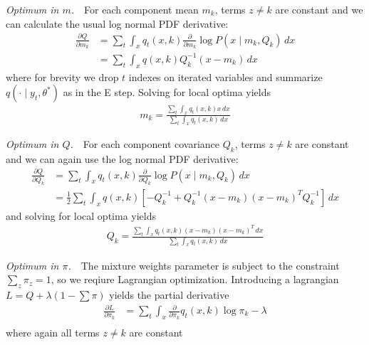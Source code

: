 \documentclass{article}         %
\newcommand{\inv}{^{-1}}
\newcommand{\pd}{\partial}
\newcommand{\EE}{\mathbb{E}}
\newcommand{\NN}{\mathcal{N}}
\newcommand{\pn}[1]{\left( #1 \right)}
\newcommand{\bc}[1]{\left[ #1 \right]}
\begin{document}
\textit{Optimum in $m$.}\ \ For each component mean $m_k$, terms $z\neq k$ are constant and we can calculate the usual log normal PDF derivative:
\begin{align}
    \frac{\pd Q}{\pd m_k}
    &=  \sum_{t}\int_{x} q_t(x, k) \frac{\pd}{\pd m_k} \log P(x \mid m_k, Q_k) \,dx \\
    &=  \sum_{t}\int_{x} q(x, k) Q_k\inv (x - m_k) \,dx
\end{align}
where for brevity we drop $t$ indexes on iterated variables and summarize $q(\cdot \mid y_t, \theta^*)$ as in the E step. Solving for local optima yields
\begin{align}
    m_k = \frac{\sum_{t} \int_x q_t(x, k) x \,dx}{\sum_{t} \int_x q_t(x, k) \,dx} 
\end{align}

\textit{Optimum in $Q$.}\ \ For each component covariance $Q_k$, terms $z\neq k$ are constant and we can again use the log normal PDF derivative: 
\begin{align}
    \frac{\pd Q}{\pd Q_k}
    &=  \sum_{t}\int_{x} q_t(x, k) \frac{\pd}{\pd Q_k} \log P(x \mid m_k, Q_k) \,dx \\
    &=  \frac{1}{2} \sum_{t}\int_{x} q(x, k) \bc{ -Q_k\inv + Q_k\inv (x - m_k) (x - m_k)^T Q_k\inv } \,dx
\end{align}
and solving for local optima yields
\begin{align}
    Q_k = \frac{\sum_{t} \int_x q_t(x, k) (x - m_k) (x - m_k)^T \,dx}{\sum_{t} \int_x q_t(x, k) \,dx}
\end{align}

\textit{Optimum in $\pi$.}\ \ The mixture weights parameter is subject to the constraint $\sum_z \pi_z = 1$, so we reqiure Lagrangian optimization. Introducing a lagrangian $L = Q + \lambda \pn{1 - \sum\pi}$ yields the partial derivative
\begin{align}
    \frac{\pd L}{\pd \pi_k} &= \sum_{t}\int_{x} \frac{\pd }{\pd \pi_k} q_t(x, k) \log \pi_{k} - \lambda \\
\end{align}
where again all terms $z\neq k$ are constant
\end{document}
